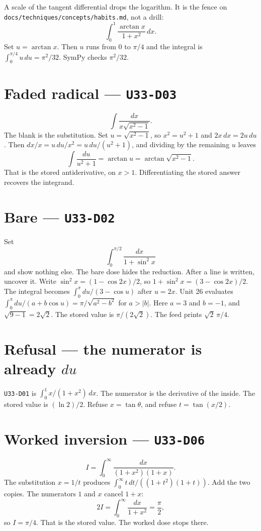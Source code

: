 A scale of the tangent differential drops the logarithm. It is the fence on \texttt{docs/techniques/concepts/habits.md}, not a drill:
\[
\int_0^1\frac{\arctan x}{1+x^2}\,dx.
\]
Set $u=\arctan x$. Then $u$ runs from $0$ to $\pi/4$ and the integral is $\int_0^{\pi/4}u\,du=\pi^2/32$. SymPy checks $\pi^2/32$.

\section{Faded radical --- \texttt{U33-D03}}
\[
\int\frac{dx}{x\sqrt{x^2-1}}.
\]
The blank is the substitution. Set $u=\sqrt{x^2-1}$, so $x^2=u^2+1$ and $2x\,dx=2u\,du$. Then $dx/x=u\,du/x^2=u\,du/(u^2+1)$, and dividing by the remaining $u$ leaves
\[
\int\frac{du}{u^2+1}=\arctan u=\arctan\sqrt{x^2-1}.
\]
That is the stored antiderivative, on $x>1$. Differentiating the stored answer recovers the integrand.

\section{Bare --- \texttt{U33-D02}}
Set
\[
\int_0^{\pi/2}\frac{dx}{1+\sin^2 x}
\]
and show nothing else. The bare dose hides the reduction. After a line is written, uncover it. Write $\sin^2 x=(1-\cos 2x)/2$, so $1+\sin^2 x=(3-\cos 2x)/2$. The integral becomes $\int_0^{\pi} du/(3-\cos u)$ after $u=2x$. Unit 26 evaluates $\int_0^{\pi} du/(a+b\cos u)=\pi/\sqrt{a^2-b^2}$ for $a>|b|$. Here $a=3$ and $b=-1$, and $\sqrt{9-1}=2\sqrt{2}$. The stored value is $\pi/(2\sqrt{2})$. The feed prints $\sqrt{2}\,\pi/4$.

\section{Refusal --- the numerator is already $du$}
\texttt{U33-D01} is $\int_0^1 x/(1+x^2)\,dx$. The numerator is the derivative of the inside. The stored value is $(\ln 2)/2$. Refuse $x=\tan\theta$, and refuse $t=\tan(x/2)$.

\section{Worked inversion --- \texttt{U33-D06}}
\[
I=\int_0^{\infty}\frac{dx}{(1+x^2)(1+x)}.
\]
The substitution $x=1/t$ produces $\int_0^{\infty} t\,dt/((1+t^2)(1+t))$. Add the two copies. The numerators $1$ and $x$ cancel $1+x$:
\[
2I=\int_0^{\infty}\frac{dx}{1+x^2}=\frac\pi2,
\]
so $I=\pi/4$. That is the stored value. The worked dose stops there.

